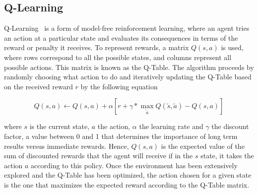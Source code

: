 \documentclass[journal]{IEEEtran}
\begin{document}
{%



\subsection{Q-Learning}{
\label{q_learning_step}

Q-Learning~\cite{Watkins1992} is a form of model-free reinforcement learning, where an agent tries an action at a particular state and evaluates its consequences in terms of the reward or penalty it receives.  To represent rewards, a matrix $Q(s,a)$ is used, where rows correspond to all the possible states, and columns represent all possible actions.  This matrix is known as the Q-Table.  The algorithm proceeds by randomly choosing what action to do and iteratively updating the Q-Table based on the received reward $r$ by the following equation

\begin{equation}
    Q(s,a) \leftarrow Q(s,a) + \alpha[r+\gamma* \max_{\tilde{a}} Q(\tilde{s}, \tilde{a})-Q(s, a) ]
    \label{equ:update_q_table}
\end{equation}

\noindent where $s$ is the current state, $a$ the action, $\alpha$ the learning rate and $\gamma$ the discount factor, a value between 0 and 1 that determines the importance of long term results versus immediate rewards.  Hence, $Q(s,a)$ is the expected value of the sum of discounted rewards that the agent will receive if in the $s$ state, it takes the action $a$ according to this policy.  Once the environment has been extensively explored and the Q-Table has been optimized, the action chosen for a given state is the one that maximizes the expected reward according to the Q-Table matrix.

}}
\end{document}
